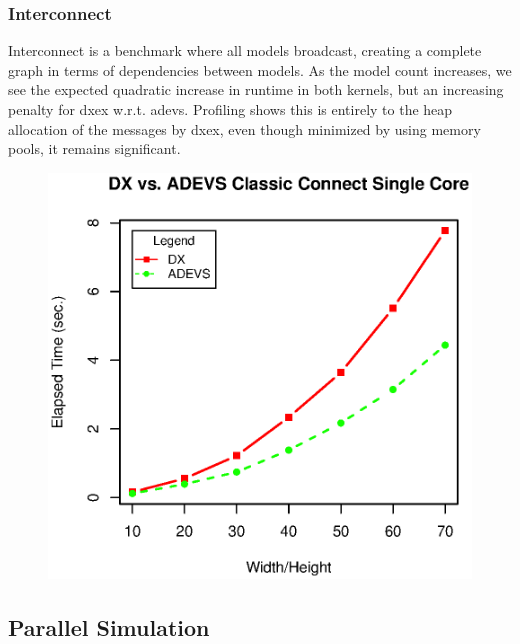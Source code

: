 \subsubsection{Interconnect}
Interconnect \cite{van2013research} is a benchmark where all models broadcast, creating a complete graph in terms of dependencies between models. As the model count increases, we see the expected quadratic increase in runtime in both kernels, but an increasing penalty for dxex w.r.t. adevs. Profiling shows this is entirely to the heap allocation of the messages by dxex, even though minimized by using memory pools, it remains significant.\\
\begin{figure}[h]
	\includegraphics[width=.5\textwidth]{fig/fig3.eps}
	\label{fig3.eps}
\end{figure}

\subsection{Parallel Simulation}
